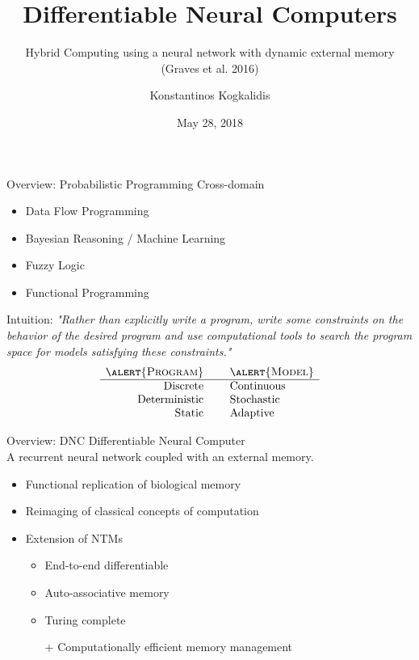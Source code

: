 \documentclass{beamer}
\title{Differentiable Neural Computers}
\subtitle{Hybrid Computing using a neural network with dynamic external memory (Graves et al. 2016)}
\author{Konstantinos Kogkalidis}
\date{May 28, 2018}
\institute{Logic and Computation}
\begin{document}
	\maketitle
	
\begin{frame}{Overview: Probabilistic Programming}
	\alert{Cross-domain}
	\begin{itemize}
	\item Data Flow Programming
	\item Bayesian Reasoning / Machine Learning
	\item Fuzzy Logic
	\item Functional Programming
	\end{itemize}
	\pause
	Intuition:
	\textit{"Rather than explicitly write a program, write some \alert{constraints} on the behavior of the desired program and use computational tools to search the program space for \alert{models} satisfying these constraints."}
	\pause
	\[\begin{array}{rcl}
	\textsc{\alert{Program}} &\ & \textsc{\alert{Model}}\\
	\hline
	\text{Discrete} &\ & \text{Continuous}\\
	\text{Deterministic} &\ & \text{Stochastic}\\
	\text{Static} &\ & \text{Adaptive}\\
	\end{array}\]
\end{frame}

\begin{frame}{Overview: DNC}
	\alert{Differentiable Neural Computer}\\
	A recurrent neural network coupled with an external memory.
	
	\pause
	\begin{itemize}
	\item Functional replication of biological memory
	\item Reimaging of classical concepts of computation
	\item Extension of NTMs
	\begin{itemize}
		\item End-to-end differentiable
		\item Auto-associative memory
		\item Turing complete
		\item[+] Computationally efficient memory management
	\end{itemize}
	\end{itemize}
\end{frame}
\end{document}
